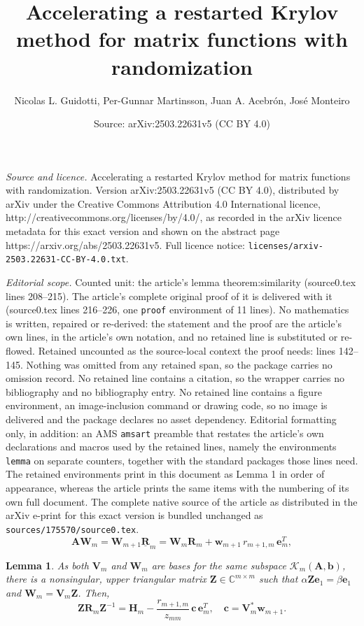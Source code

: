 \documentclass[10pt,a4paper]{amsart}
\title{Accelerating a restarted Krylov method for matrix functions with randomization}
\author{Nicolas L. Guidotti, Per-Gunnar Martinsson, Juan A. Acebr\'on, Jos\'e Monteiro}
\date{Source: arXiv:2503.22631v5 (CC BY 4.0)}
\newtheorem{lemma}{Lemma}
\newcommand{\mat}[1]{\mathbf{#1}}
\renewcommand{\vec}[1]{\mathbf{#1}}
\begin{document}
\maketitle

\noindent\emph{Source and licence.} Accelerating a restarted Krylov method for matrix functions with randomization. Version arXiv:2503.22631v5 (CC BY 4.0), distributed by arXiv under the Creative Commons Attribution 4.0 International licence, http://creativecommons.org/licenses/by/4.0/, as recorded in the arXiv licence metadata for this exact version and shown on the abstract page https://arxiv.org/abs/2503.22631v5. Full licence notice: \texttt{licenses/arxiv-2503.22631-CC-BY-4.0.txt}.\par\smallskip

\noindent\textit{Editorial scope.} Counted unit: the article's lemma theorem:similarity (source0.tex lines 208--215). The article's complete original proof of it is delivered with it (source0.tex lines 216--226, one \texttt{proof} environment of 11 lines). No mathematics is written, repaired or re-derived: the statement and the proof are the article's own lines, in the article's own notation, and no retained line is substituted or re-flowed.  Retained uncounted as the source-local context the proof needs: lines 142--145.  Nothing was omitted from any retained span, so the package carries no omission record.  No retained line contains a citation, so the wrapper carries no bibliography and no bibliography entry.  No retained line contains a figure environment, an image-inclusion command or drawing code, so no image is delivered and the package declares no asset dependency.  Editorial formatting only, in addition: an AMS \texttt{amsart} preamble that restates the article's own declarations and macros used by the retained lines, namely the environments \texttt{lemma} on separate counters, together with the standard packages those lines need.  The retained environments print in this document as Lemma 1 in order of appearance, whereas the article prints the same items with the numbering of its own full document.  The complete native source of the article as distributed in the arXiv e-print for this exact version is bundled unchanged as \texttt{sources/175570/source0.tex}.
\begin{equation}
\label{eq:rand_arnoldi}
\mat{A} \mat{W}_m = \mat{W}_{m + 1} \mat{\underline{R}}_m =  \mat{W}_{m} \mat{R}_m + \vec{w}_{m + 1} \, r_{m + 1, m} \, \vec{e}^T_m,
\end{equation}

\begin{lemma}
\label{theorem:similarity}
As both $\mat{V}_m$ and $\mat{W}_m$ are bases for the same subspace $\mathcal{K}_m(\mat{A}, \vec{b})$, there is a nonsingular, upper triangular matrix $\mat{Z} \in \mathbb{C}^{m \times m}$ such that $\alpha \mat{Z}\vec{e}_1 = \beta \vec{e}_1$ and $\mat{W}_m = \mat{V}_m \mat{Z}$. Then,
\begin{equation}
\label{eq:similarity}
\mat{Z} \mat{R}_m \mat{Z}^{-1} = \mat{H}_m - \frac{r_{m+1, m}}{z_{mm}} \, \vec{c} \, \vec{e}_m^T, \quad \vec{c} = \mat{V}_m^* \vec{w}_{m + 1}.
\end{equation}
\end{lemma}
\end{document}
